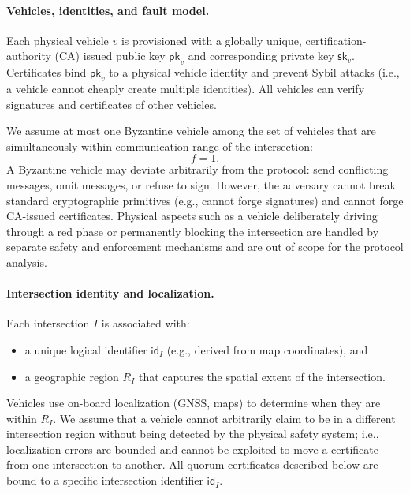 \documentclass[fleqn,10pt]{olplainarticle}
\begin{document}
\paragraph{Vehicles, identities, and fault model.}
Each physical vehicle $v$ is provisioned with a globally unique, certification-authority (CA) issued public key $\mathsf{pk}_v$ and corresponding private key $\mathsf{sk}_v$. Certificates bind $\mathsf{pk}_v$ to a physical vehicle identity and prevent Sybil attacks (i.e., a vehicle cannot cheaply create multiple identities). All vehicles can verify signatures and certificates of other vehicles.

We assume at most one Byzantine vehicle among the set of vehicles that are simultaneously within communication range of the intersection:
\[
  f = 1.
\]
A Byzantine vehicle may deviate arbitrarily from the protocol: send conflicting messages, omit messages, or refuse to sign. However, the adversary cannot break standard cryptographic primitives (e.g., cannot forge signatures) and cannot forge CA-issued certificates. Physical aspects such as a vehicle deliberately driving through a red phase or permanently blocking the intersection are handled by separate safety and enforcement mechanisms and are out of scope for the protocol analysis.

\paragraph{Intersection identity and localization.}
Each intersection $I$ is associated with:
\begin{itemize}
  \item a unique logical identifier $\mathsf{id}_I$ (e.g., derived from map coordinates), and
  \item a geographic region $R_I$ that captures the spatial extent of the intersection.
\end{itemize}
Vehicles use on-board localization (GNSS, maps) to determine when they are within $R_I$. We assume that a vehicle cannot arbitrarily claim to be in a different intersection region without being detected by the physical safety system; i.e., localization errors are bounded and cannot be exploited to move a certificate from one intersection to another. All quorum certificates described below are bound to a specific intersection identifier $\mathsf{id}_I$.
\end{document}

